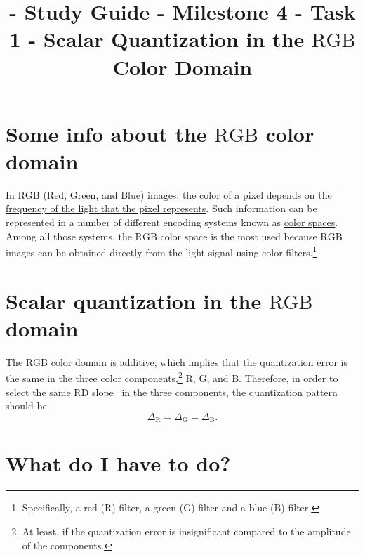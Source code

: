 

\title{\SM{} - Study Guide - Milestone 4 - Task 1 - Scalar Quantization in the $\text{RGB}$ Color Domain}

\maketitle

\tableofcontents

\section{Some info about the $\text{RGB}$ color domain}

In $\text{RGB}$ (Red, Green, and Blue) images, the color of a pixel
depends on the
\href{https://en.wikipedia.org/wiki/Visible_spectrum}{frequency of the
  light that the pixel represents}. Such information can be
represented in a number of different encoding systems known as
\href{https://en.wikipedia.org/wiki/Color_space}{color spaces}. Among
all those systems, the $\text{RGB}$ color space is the most used
because $\text{RGB}$ images can be obtained directly from the light
signal using color filters.\footnote{Specifically, a red (R) filter, a
green (G) filter and a blue (B) filter.}


\section{Scalar quantization in the $\text{RGB}$ domain}

The $\text{RGB}$ color domain is additive, which implies that the
quantization error is the same in the three color
components,\footnote{At least, if the quantization error is
insignificant compared to the amplitude of the components.}
$\text{R}$, $\text{G}$, and $\text{B}$. Therefore, in order to select
the same RD slope~\cite{vruiz__information_theory} in the three
components, the quantization pattern should be
\begin{equation}
  \Delta_\text{R} = \Delta_\text{G} = \Delta_\text{B}.
\end{equation}


\section{What do I have to do?}

